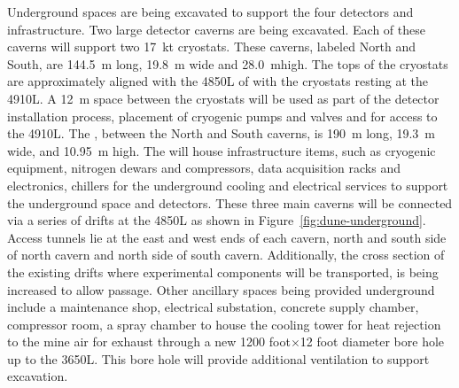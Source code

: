 Underground spaces are being excavated to support the four
 detectors and infrastructure.  Two large detector caverns
are being excavated.  Each of these caverns will support two
\SI{17}{\kilo\tonne} cryostats.  These caverns, labeled North and
South, are \SI{144.5}{\meter} long, \SI{19.8}{\meter} wide and
\SI{28.0}{\meter}high. The tops of the cryostats are approximately
aligned with the 4850L of  with the cryostats resting
at the 4910L.  A \SI{12}{\meter} space between the cryostats will
be used as part of the detector installation process, placement of
cryogenic pumps and valves and for access to the 4910L.  The
, between the North and South caverns, is \SI{190}{\meter}
long, \SI{19.3}{\meter} wide, and \SI{10.95}{\meter} high.  The
 will house infrastructure items, such as cryogenic
equipment, nitrogen dewars and compressors, data acquisition racks and
electronics, chillers for the underground cooling and electrical
services to support the underground space and detectors.  These three
main caverns will be connected via a series of drifts at the 4850L as shown in
Figure~\ref{fig:dune-underground}. Access tunnels lie at the east and
west ends of each cavern, north and south side of north cavern and
north side of south cavern. Additionally, the cross section of the
existing drifts where experimental components will be transported, is
being increased to allow passage.  Other ancillary spaces being
provided underground include a maintenance shop, electrical
substation, concrete supply chamber, compressor room, a spray chamber
to house the cooling tower for heat rejection to the mine air for
exhaust through a new 1200 foot$\times$12 foot diameter bore hole up
to the 3650L.  This bore hole will provide additional ventilation
to support excavation.

